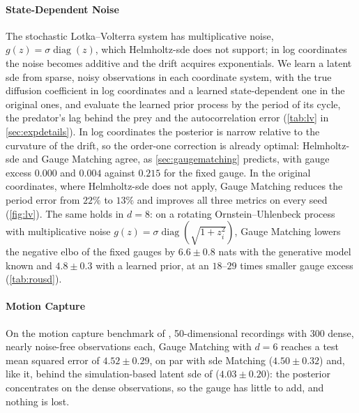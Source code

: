 \documentclass{article} %
\newcommand{\vol}{g}
\begin{document}
\paragraph{State-Dependent Noise}
The stochastic Lotka--Volterra system \citep{vadillo2019comparing,bartosh2025sde} has multiplicative noise, $\vol(z) = \sigma \operatorname{diag}(z)$, which Helmholtz-\gls{sde} does not support; in log coordinates the noise becomes additive and the drift acquires exponentials. We learn a latent \gls{sde} from sparse, noisy observations in each coordinate system, with the true diffusion coefficient in log coordinates and a learned state-dependent one in the original ones, and evaluate the learned prior process by the period of its cycle, the predator's lag behind the prey and the autocorrelation error (\cref{tab:lv} in \cref{sec:expdetails}). In log coordinates the posterior is narrow relative to the curvature of the drift, so the order-one correction is already optimal: Helmholtz-\gls{sde} and Gauge Matching agree, as \cref{sec:gaugematching} predicts, with gauge excess $0.000$ and $0.004$ against $0.215$ for the fixed gauge. In the original coordinates, where Helmholtz-\gls{sde} does not apply, Gauge Matching reduces the period error from $22\%$ to $13\%$ and improves all three metrics on every seed (\cref{fig:lv}). The same holds in $d = 8$: on a rotating Ornstein--Uhlenbeck process with multiplicative noise $\vol(z) = \sigma \operatorname{diag}(\sqrt{1 + z_i^2})$, Gauge Matching lowers the negative \gls{elbo} of the fixed gauges by $6.6 \pm 0.8$ nats with the generative model known and $4.8 \pm 0.3$ with a learned prior, at an $18$--$29$ times smaller gauge excess (\cref{tab:rousd}).
\paragraph{Motion Capture}
On the motion capture benchmark of \citet{gan2015deep}, 50-dimensional recordings with 300 dense, nearly noise-free observations each, Gauge Matching with $d = 6$ reaches a test mean squared error of $4.52 \pm 0.29$, on par with \gls{sde} Matching ($4.50 \pm 0.32$) and, like it, behind the simulation-based latent \gls{sde} of \citet{li2020scalable} ($4.03 \pm 0.20$): the posterior concentrates on the dense observations, so the gauge has little to add, and nothing is lost.
\end{document}
